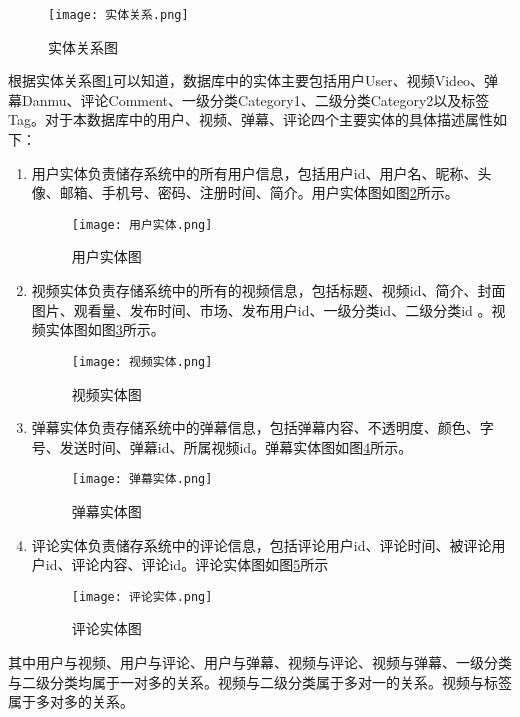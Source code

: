 \begin{figure}[hbt]
    \centering
    \texttt{[image: 实体关系.png]}
    \caption{实体关系图}
    \label{实体关系图}
\end{figure}

根据实体关系图\ref{实体关系图}可以知道，数据库中的实体主要包括用户User、视频Video、弹幕Danmu、评论Comment、一级分类Category1、二级分类Category2以及标签Tag。对于本数据库中的用户、视频、弹幕、评论四个主要实体的具体描述属性如下：

\begin{enumerate}[label=(\arabic*)]
    \item 用户实体负责储存系统中的所有用户信息，包括用户id、用户名、昵称、头像、邮箱、手机号、密码、注册时间、简介。用户实体图如图\ref{用户实体图}所示。
    \begin{figure}[hbt]
        \centering
        \texttt{[image: 用户实体.png]}
        \caption{用户实体图}
        \label{用户实体图}
    \end{figure}
    \item 视频实体负责存储系统中的所有的视频信息，包括标题、视频id、简介、封面图片、观看量、发布时间、市场、发布用户id、一级分类id、二级分类id 。视频实体图如图\ref{视频实体图}所示。
    \begin{figure}[hbt]
        \centering
        \texttt{[image: 视频实体.png]}
        \caption{视频实体图}
        \label{视频实体图}
    \end{figure}
    \item 弹幕实体负责存储系统中的弹幕信息，包括弹幕内容、不透明度、颜色、字号、发送时间、弹幕id、所属视频id。弹幕实体图如图\ref{弹幕实体图}所示。
    \begin{figure}[hbt]
        \centering
        \texttt{[image: 弹幕实体.png]}
        \caption{弹幕实体图}
        \label{弹幕实体图}
    \end{figure}
    \item 评论实体负责储存系统中的评论信息，包括评论用户id、评论时间、被评论用户id、评论内容、评论id。评论实体图如图\ref{评论实体图}所示
    \begin{figure}[hbt]
        \centering
        \texttt{[image: 评论实体.png]}
        \caption{评论实体图}
        \label{评论实体图}
    \end{figure}

\end{enumerate}

其中用户与视频、用户与评论、用户与弹幕、视频与评论、视频与弹幕、一级分类与二级分类均属于一对多的关系。视频与二级分类属于多对一的关系。视频与标签属于多对多的关系。

